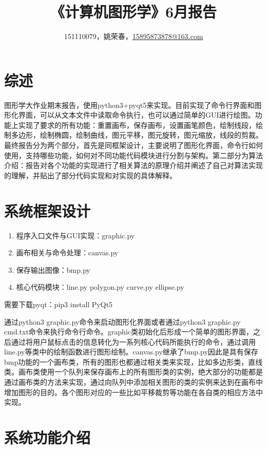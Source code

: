 \documentclass[a4paper,UTF8]{article}
\theoremstyle{definition}
\begin{document}
\title{\textbf{《计算机图形学》6月报告}}
\author{151110079，姚荣春，\href{mailto:15895873878@163.com}{15895873878@163.com}}
\maketitle

\section{综述}
图形学大作业期末报告，使用python3+pyqt5来实现。目前实现了命令行界面和图形化界面，可以从文本文件中读取命令执行，也可以通过简单的GUI进行绘图。功能上实现了要求的所有功能：重置画布，保存画布，设置画笔颜色，绘制线段，绘制多边形，绘制椭圆，绘制曲线，图元平移，图元旋转，图元缩放，线段的剪裁。最终报告分为两个部分，首先是同框架设计，主要说明了图形化界面，命令行如何使用，支持哪些功能，如何对不同功能代码模块进行分割与架构。第二部分为算法介绍：报告对各个功能的实现进行了相关算法的原理介绍并阐述了自己对算法实现的理解，并贴出了部分代码实现和对实现的具体解释。

\section{系统框架设计}

\begin{enumerate}
\item 程序入口文件与GUI实现：graphic.py
\item 画布相关与命令处理：canvas.py 
\item 保存输出图像：bmp.py
\item 核心代码模块：line.py polygon.py curve.py ellipse.py
\end{enumerate}

需要下载pyqt：pip3 install PyQt5

通过python3 graphic.py命令来启动图形化界面或者通过python3 graphic.py cmd.txt命令来执行命令行命令。graphic类初始化后形成一个简单的图形界面，之后通过将用户鼠标点击的信息转化为一系列核心代码所能执行的命令，通过调用line.py等类中的绘制函数进行图形绘制。canvas.py继承了bmp.py因此是具有保存bmp功能的一个画布类，所有的图形也都通过相关类来实现，比如多边形类，直线类。画布类使用一个队列来保存画布上的所有图形类的实例，绝大部分的功能都是通过画布类的方法来实现，通过向队列中添加相关图形的类的实例来达到在画布中增加图形的目的。各个图形对应的一些比如平移裁剪等功能在各自类的相应方法中实现。

\section{系统功能介绍}
\end{document}
